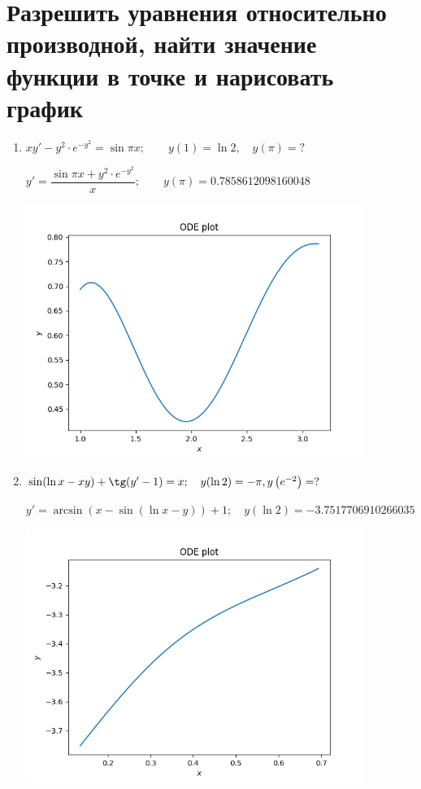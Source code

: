 \documentclass[14pt, a4paper]{extarticle}
\begin{document}
		\section{Разрешить уравнения относительно производной, найти значение функции в точке и нарисовать график}
			\begin{enumerate}
				\item \(xy' - y^2 \cdot e^{-y^2} = \sin {\pi x}; \qquad y(1) = \ln 2, \quad y(\pi) = \mathcal{?}\)
					
					\(y' = \dfrac{\sin {\pi x} + y^2 \cdot e^{-y^2}}{x}; \qquad y(\pi) = 0.7858612098160048\)
					
					\hspace{-1cm}\includegraphics[width=11cm]{plot_1}
					
				\item \(\sin(\ln x - xy) + \tg(y' - 1) = x; \quad y(\ln 2) = -\pi, y\left({e^{-2}}\right) = ?\)
					
					\(y' = \arcsin {\left(x - \sin {\left(\ln x - y\right)}\right)} + 1; \quad y(\ln 2) = -3.7517706910266035\)
					
					\hspace{-1cm}\includegraphics[width=11cm]{plot_2}
					

\end{enumerate}
\end{document}
